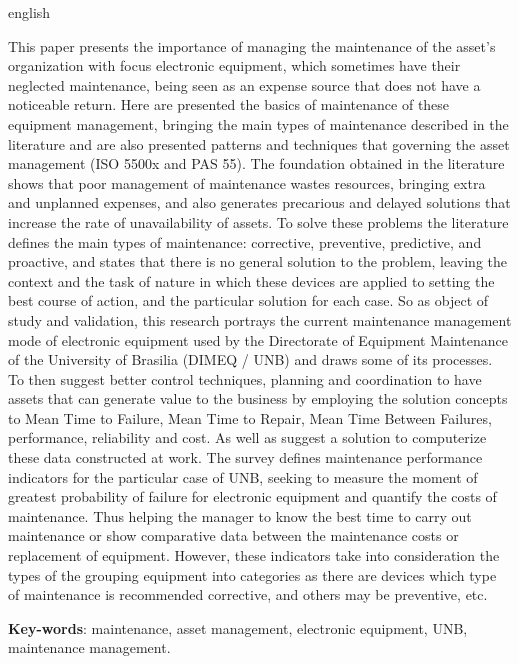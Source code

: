 \begin{resumo}[Abstract]
 \begin{otherlanguage*}{english}
 
This paper presents the importance of managing the maintenance of the asset’s organization with focus electronic equipment, which sometimes have their neglected maintenance, being seen as an expense source that does not have a noticeable return. Here are presented the basics of maintenance of these equipment management, bringing the main types of maintenance described in the literature and are also presented patterns and techniques that governing the asset management (ISO 5500x and PAS 55).
The foundation obtained in the literature shows that poor management of maintenance wastes resources, bringing extra and unplanned expenses, and also generates precarious and delayed solutions that increase the rate of unavailability of assets. To solve these problems the literature defines the main types of maintenance: corrective, preventive, predictive, and proactive, and states that there is no general solution to the problem, leaving the context and the task of nature in which these devices are applied to setting the best course of action, and the particular solution for each case.
So as object of study and validation, this research portrays the current maintenance management mode of electronic equipment used by the Directorate of Equipment Maintenance of the University of Brasilia (DIMEQ / UNB) and draws some of its processes. To then suggest better control techniques, planning and coordination to have assets that can generate value to the business by employing the solution concepts to Mean Time to Failure,  Mean Time to Repair,  Mean Time Between Failures, performance, reliability and cost. As well as suggest a solution to computerize these data constructed at work.
The survey defines maintenance performance indicators for the particular case of UNB, seeking to measure the moment of greatest probability of failure for electronic equipment and quantify the costs of maintenance. Thus helping the manager to know the best time to carry out maintenance or show comparative data between the maintenance costs or replacement of equipment. However, these indicators take into consideration the types of the grouping equipment into categories as there are devices which type of maintenance is recommended corrective, and others may be preventive, etc.


   \vspace{\onelineskip}
 
   \noindent 
   \textbf{Key-words}: maintenance, asset management, electronic equipment, UNB, maintenance management.
 \end{otherlanguage*}
\end{resumo}
